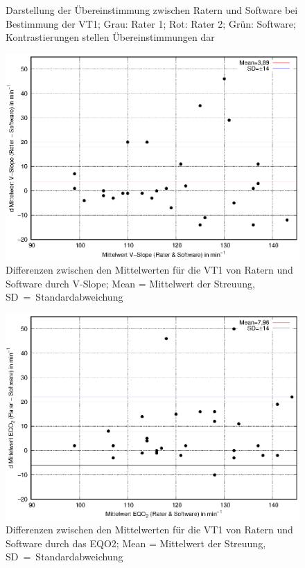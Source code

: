 \begin{figure}[H]
\begin{subfigure}[c]{0.45\textwidth}
			\label{subpic:pic2}
	\end{subfigure}
\caption[Grafische Darstellung der Übereinstimmung für die VT1]{Darstellung der Übereinstimmung zwischen Ratern und Software bei Bestimmung der VT1; Grau: Rater 1; Rot: Rater 2; Grün: Software; Kontrastierungen stellen Übereinstimmungen dar}
\label{pic:pic22}
\end{figure}
%
\begin{figure}[H]
	\centering
	\includegraphics[scale=0.95]{Bilder/vslope.eps}
	\caption[Differenzen der V-Slope-Ergebnisse zwischen Ratern und Software]{Differenzen zwischen den Mittelwerten für die VT1 von Ratern und Software durch V-Slope; Mean = Mittelwert der Streuung, SD~=~Standardabweichung}
	\label{pic:pic23}
\end{figure}
%
\begin{figure}[H]
	\centering
	\includegraphics[scale=0.95]{Bilder/eqo2.eps}
	\caption[Differenzen der \gls{EQO2}-Ergebnisse zwischen Ratern und Software]{Differenzen zwischen den Mittelwerten für die VT1 von Ratern und Software durch das \gls{EQO2}; Mean = Mittelwert der Streuung, SD~=~Standardabweichung}
	\label{pic:pic24}
\end{figure}
